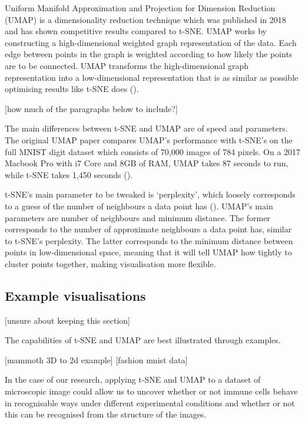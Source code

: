 Uniform Manifold Approximation and Projection for Dimension Reduction (UMAP) is a dimensionality reduction technique which was published in 2018 and has shown competitive results compared to t-SNE. UMAP works by constructing a high-dimensional weighted graph representation of the data. Each edge between points in the graph is weighted according to how likely the points are to be connected. UMAP transforms the high-dimensional graph representation into a low-dimensional representation that is as similar as possible optimising results like t-SNE does (\cite{https://pair-code.github.io/understanding-umap/}).

[how much of the paragraphs below to include?]

The main differences between t-SNE and UMAP are of speed and parameters. The original UMAP paper compares UMAP's performance with t-SNE's on the full MNIST digit dataset which consists of 70,000 images of 784 pixels. On a 2017 Macbook Pro with i7 Core and 8GB of RAM, UMAP takes 87 seconds to run, while t-SNE takes 1,450 seconds (\cite{https://arxiv.org/pdf/1802.03426.pdf}).

t-SNE's main parameter to be tweaked is `perplexity', which loosely corresponds to a guess of the number of neighbours a data point has (\cite{https://distill.pub/2016/misread-tsne/}). UMAP's main parameters are number of neighbours and minimum distance. The former corresponds to the number of approximate neighbours a data point has, similar to t-SNE's perplexity. The latter corresponds to the minimum distance between points in low-dimensional space, meaning that it will tell UMAP how tightly to cluster points together, making visualisation more flexible.

\subsection{Example visualisations}

[unsure about keeping this section]

The capabilities of t-SNE and UMAP are best illustrated through examples.

[mammoth 3D to 2d example]
[fashion mnist data]

In the case of our research, applying t-SNE and UMAP to a dataset of microscopic image could allow us to uncover whether or not immune cells behave in recognisable ways under different experimental conditions and whether or not this can be recognised from the structure of the images.

